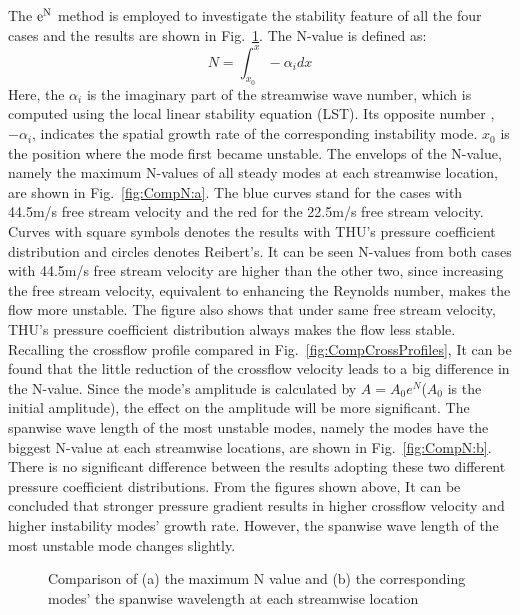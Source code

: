 \documentclass{AIAA}
\begin{document}
The ${\rm e^N}$ method is employed to investigate the stability feature of all the four cases and the results are shown in Fig.~\ref{fig:CompN}. The N-value is defined as:
\begin{equation}\label{e:eNdef}
  N=\int_{x_0}^x -\alpha_idx
\end{equation}
Here, the $\alpha_i$ is the imaginary part of the streamwise wave number, which is computed using the local linear stability equation (LST). Its opposite number , $-\alpha_i$, indicates the spatial growth rate of the corresponding instability mode. $x_0$ is the position where the mode first became unstable. The envelops of the N-value, namely the maximum N-values of all steady modes at each streamwise location, are shown in Fig.~\ref{fig:CompN:a}. The blue curves stand for the cases with 44.5m/s free stream velocity and the red for the 22.5m/s free stream velocity. Curves with square symbols denotes the results with THU's pressure coefficient distribution and circles denotes Reibert's. It can be seen N-values from both cases with 44.5m/s free stream velocity are higher than the other two, since increasing the free stream velocity, equivalent to enhancing the Reynolds number, makes the flow more unstable. The figure also shows that under same free stream velocity, THU's pressure coefficient distribution always makes the flow less stable. Recalling the crossflow profile compared in Fig.~\ref{fig:CompCrossProfiles}, It can be found that the little reduction of the crossflow velocity leads to a big difference in the N-value. Since the mode's amplitude is calculated by $A=A_0e^{N}$($A_0$ is the initial amplitude), the effect on the amplitude will be more significant. The spanwise wave length of the most unstable modes, namely the modes have the biggest N-value at each streamwise locations, are shown in Fig.~\ref{fig:CompN:b}. There is no significant difference between the results adopting these two different pressure coefficient distributions. From the figures shown above, It can be concluded that stronger pressure gradient results in higher crossflow velocity and higher instability modes' growth rate. However, the spanwise wave length of the most unstable mode changes slightly.
\begin{figure}
\centering
{}
\caption{Comparison of (a) the maximum N value and (b) the corresponding modes' the spanwise wavelength at each streamwise location }
\label{fig:CompN} %
\end{figure}
\end{document}
